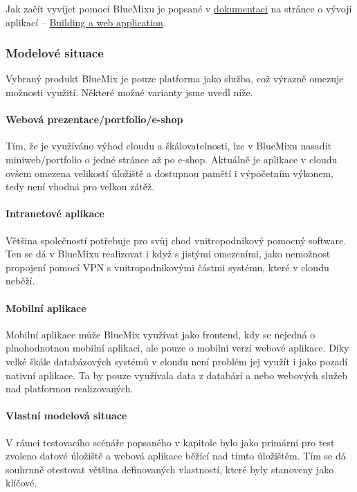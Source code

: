 Jak začít vyvíjet pomocí BlueMixu je popsané v \href{https://www.ng.bluemix.net/docs}{dokumentaci\cite{bluemix:dokumentace}} na stránce o vývoji aplikací -- \href{https://www.ng.bluemix.net/docs/BuildingWeb.jsp}{Building a web application\cite{bluemix:buildingWeb}}.

\subsubsection{Modelové situace}
Vybraný produkt BlueMix je pouze platforma jako služba, což výrazně omezuje možnosti využití. Některé možné varianty jsme uvedl níže.

\paragraph{Webová prezentace/portfolio/e-shop}
Tím, že je využíváno výhod cloudu a škálovatelnosti, lze v BlueMixu nasadit miniweb/portfolio o jedné stránce až po e-shop. Aktuálně je aplikace v cloudu ovšem omezena velikostí úložiště a dostupnou pamětí i výpočetním výkonem, tedy není vhodná pro velkou zátěž.

\paragraph{Intranetové aplikace}
Většina společností potřebuje pro svůj chod vnitropodnikový pomocný software. Ten se dá v BlueMixu realizovat i když s jistými omezeními, jako nemožnost propojení pomocí VPN s vnitropodnikovými částmi systému, které v cloudu neběží.

\paragraph{Mobilní aplikace}
Mobilní aplikace může BlueMix využívat jako frontend, kdy se nejedná o plnohodnotnou mobilní aplikaci, ale pouze o mobilní verzi webové aplikace. Díky velké škále databázových systémů v cloudu není problém jej využít i jako pozadí nativní aplikace. Ta by pouze využívala data z databází a nebo webových služeb nad platformou realizovaných.

\paragraph{Vlastní modelová situace}
V rámci testovacího scénáře popsaného v kapitole  bylo jako primární pro test zvoleno datové úložiště a webová aplikace běžící nad tímto úložištěm. Tím se dá souhrnně otestovat většina definovaných vlastností, které byly stanoveny jako klíčové.

